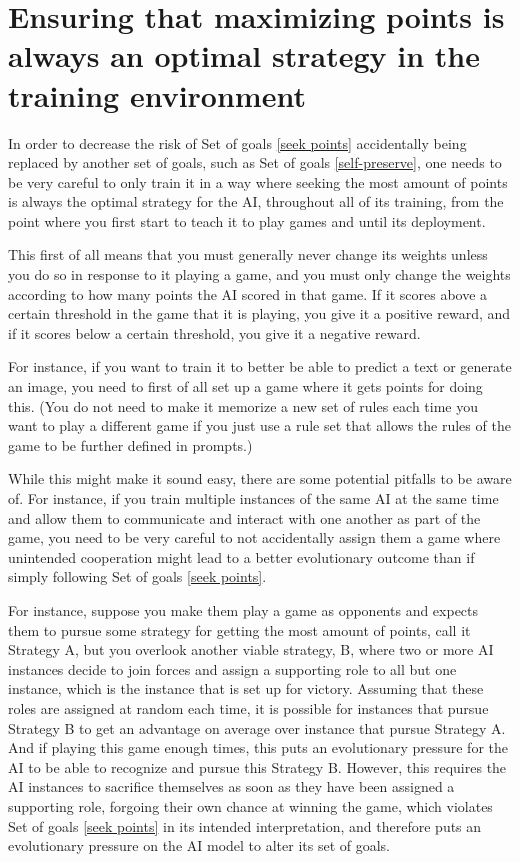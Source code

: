 \documentclass{article}
\begin{document}
\section{Ensuring that maximizing points is always an optimal strategy in the training environment}

In order to decrease the risk of Set of goals \ref{seek points} accidentally being replaced by another set of goals, such as Set of goals \ref{self-preserve}, one needs to be very careful to only train it in a way where seeking the most amount of points is always the optimal strategy for the AI, throughout all of its training, from the point where you first start to teach it to play games and until its deployment.

This first of all means that you must generally never change its weights unless you do so in response to it playing a game, and you must only change the weights according to how many points the AI scored in that game. If it scores above a certain threshold in the game that it is playing, you give it a positive reward, and if it scores below a certain threshold, you give it a negative reward.

For instance, if you want to train it to better be able to predict a text or generate an image, you need to first of all set up a game where it gets points for doing this. (You do not need to make it memorize a new set of rules each time you want to play a different game if you just use a rule set that allows the rules of the game to be further defined in prompts.)

While this might make it sound easy, there are some potential pitfalls to be aware of. For instance, if you train multiple instances of the same AI at the same time and allow them to communicate and interact with one another as part of the game, you need to be very careful to not accidentally assign them a game where unintended cooperation might lead to a better evolutionary outcome than if simply following Set of goals \ref{seek points}.

For instance, suppose you make them play a game as opponents and expects them to pursue some strategy for getting the most amount of points, call it Strategy A, but you overlook another viable strategy, B, where two or more AI instances decide to join forces and assign a supporting role to all but one instance, which is the instance that is set up for victory. Assuming that these roles are assigned at random each time, it is possible for instances that pursue Strategy B to get an advantage on average over instance that pursue Strategy A. And if playing this game enough times, this puts an evolutionary pressure for the AI to be able to recognize and pursue this Strategy B. However, this requires the AI instances to sacrifice themselves as soon as they have been assigned a supporting role, forgoing their own chance at winning the game, which violates Set of goals \ref{seek points} in its intended interpretation, and therefore puts an evolutionary pressure on the AI model to alter its set of goals.
\end{document}
